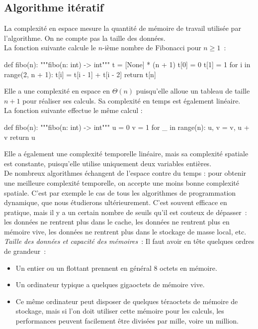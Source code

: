 \documentclass{magnolia}
\begin{document}
\subsection{Algorithme itératif}

La complexité en espace mesure la quantité de mémoire de travail utilisée
par l'algorithme. On ne compte pas la taille des données.\\

La fonction suivante calcule le $n$-ième nombre de Fibonacci pour $n\geq 1$~:
\begin{pythoncodeline}
def fibo(n):
    """fibo(n: int) -> int"""
    t = [None] * (n + 1)
    t[0] = 0
    t[1] = 1
    for i in range(2, n + 1):
        t[i] = t[i - 1] + t[i - 2]
    return t[n]
\end{pythoncodeline}
          Elle a une complexité en espace en $\Theta(n)$ puisqu'elle
          alloue un tableau de taille $n + 1$ pour réaliser ses
          calculs. Sa complexité en temps est également linéaire.\\

La fonction suivante effectue le même calcul :

\begin{pythoncodeline}
def fibo(n):
    """fibo(n: int) -> int"""
    u = 0
    v = 1
    for _ in range(n):
        u, v = v, u + v
    return u
\end{pythoncodeline}
          Elle a également une complexité temporelle linéaire,
          mais sa complexité spatiale est constante, puisqu'elle
          utilise uniquement deux variables entières.\\



De nombreux algorithmes \og échangent de l'espace contre du temps \fg : pour obtenir une meilleure
complexité temporelle, on accepte une moins bonne complexité spatiale. C'est par exemple le cas
de tous les algorithmes de programmation dynamique, que nous étudierons ultérieurement.
C'est souvent efficace en pratique, mais il
y a un certain nombre de seuils qu'il est couteux de dépasser~: les données ne rentrent plus dans
le cache, les données ne rentrent plus en mémoire vive, les données ne rentrent plus dans le
stockage de masse local, etc.\\

\noindent
\emph{Taille des données et capacité des mémoires}~:
Il faut avoir en tête quelques ordres de grandeur~:
\begin{itemize}
  \item Un entier ou un flottant prennent en général 8 octets en mémoire.
  \item Un ordinateur typique a quelques gigaoctets de mémoire vive.
  \item Ce même ordinateur peut disposer de quelques téraoctets de mémoire
  de stockage, mais si l'on doit utiliser cette mémoire pour les calculs,
  les performances peuvent facilement être divisées par mille, voire un million.
\end{itemize}
\end{document}
